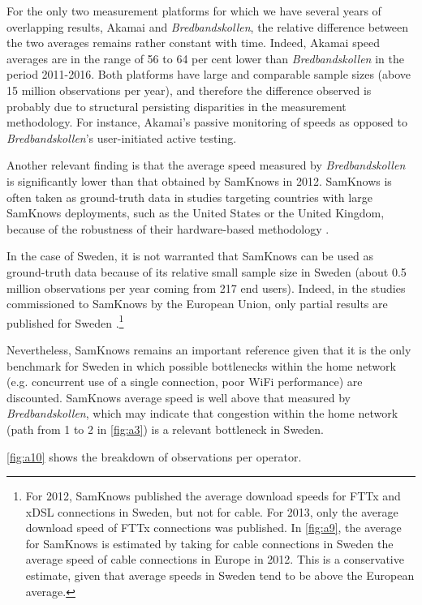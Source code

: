 \documentclass[12pt]{article}
\begin{document}
For the only two measurement platforms for which we have several years of overlapping results, Akamai and \textit{Bredbandskollen}, the relative difference between the two averages remains rather constant with time. Indeed, Akamai speed averages are in the range of 56 to 64 per cent lower than \textit{Bredbandskollen} in the period 2011-2016. Both platforms have large and comparable sample sizes (above 15 million observations per year), and therefore the difference observed is probably due to structural persisting disparities in the measurement methodology. For instance, Akamai's passive monitoring of speeds as opposed to \textit{Bredbandskollen}'s user-initiated active testing.

Another relevant finding is that the average speed measured by \textit{Bredbandskollen} is significantly lower than that obtained by SamKnows in 2012. SamKnows is often taken as ground-truth data in studies targeting countries with large SamKnows deployments, such as the United States or the United Kingdom, because of the robustness of their hardware-based methodology \citep{riddlesden2014,canadi2012}. 

In the case of Sweden, it is not warranted that SamKnows can be used as ground-truth data because of its relative small sample size in Sweden (about 0.5 million observations per year coming from 217 end users). Indeed, in the studies commissioned to SamKnows by the European Union, only partial results are published for Sweden \citep{samknows2012,samknows2013}.\footnote{For 2012, SamKnows published the average download speeds for FTTx and xDSL connections in Sweden, but not for cable. For 2013, only the average download speed of FTTx connections was published. In \autoref{fig:a9}, the average for SamKnows is estimated by taking for cable connections in Sweden the average speed of cable connections in Europe in 2012. This is a conservative estimate, given that average speeds in Sweden tend to be above the European average.} 

Nevertheless, SamKnows remains an important reference given that it is the only benchmark for Sweden in which possible bottlenecks within the home network (e.g. concurrent use of a single connection, poor WiFi performance) are discounted. SamKnows average speed is well above that measured by \textit{Bredbandskollen}, which may indicate that congestion within the home network (path from 1 to 2 in \autoref{fig:a3}) is a relevant bottleneck in Sweden.      
          
\autoref{fig:a10} shows the breakdown of observations per operator. 
 
\end{document}
